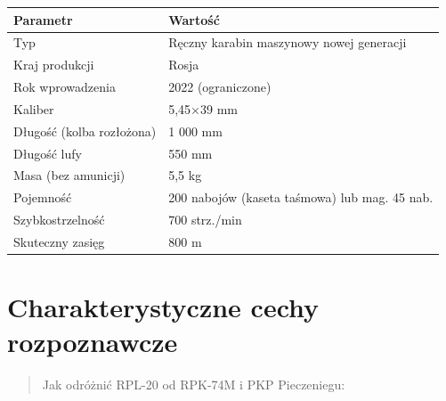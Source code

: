 \documentclass[12pt,openany,oneside]{book}
\begin{document}
\begin{longtable}[]{@{}ll@{}}
\toprule\noalign{}
Parametr & Wartość \\
\midrule\noalign{}
\endhead
\bottomrule\noalign{}
\endlastfoot
Typ & Ręczny karabin maszynowy nowej generacji \\
Kraj produkcji & Rosja \\
Rok wprowadzenia & 2022 (ograniczone) \\
Kaliber & 5,45×39 mm \\
Długość (kolba rozłożona) & 1 000 mm \\
Długość lufy & 550 mm \\
Masa (bez amunicji) & 5,5 kg \\
Pojemność & 200 nabojów (kaseta taśmowa) lub mag. 45 nab. \\
Szybkostrzelność & 700 strz./min \\
Skuteczny zasięg & 800 m \\
\end{longtable}

\section{Charakterystyczne cechy
rozpoznawcze}\label{charakterystyczne-cechy-rozpoznawcze-55}

\begin{quote}
Jak odróżnić RPL-20 od RPK-74M i PKP Pieczeniegu:
\end{quote}
\end{document}
